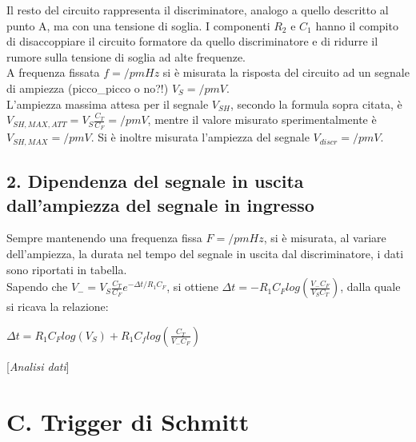 \documentclass[10pt,a4paper]{article}
\newcommand{\rem}[1]{[\emph{#1}]}
\begin{document}
Il resto del circuito rappresenta il discriminatore, analogo a quello descritto al punto A, ma con una tensione di soglia. I componenti $R_2$ e $C_1$ hanno il compito di disaccoppiare il circuito formatore da quello discriminatore e di ridurre il rumore sulla tensione di soglia ad alte frequenze.\\
A frequenza fissata $f = /pm Hz$ si è misurata la risposta del circuito ad un segnale di ampiezza (picco_picco o no?!) $V_S = /pm V$.\\
L'ampiezza massima attesa per il segnale $V_{SH}$, secondo la formula sopra citata, è $V_{SH,MAX,ATT} = V_S \frac{C_T}{C_F} =  /pm V$, mentre il valore misurato sperimentalmente è $V_{SH,MAX} = /pm V$.
Si è inoltre misurata l'ampiezza del segnale $V_{discr} = /pm V$.

\subsection*{2. Dipendenza del segnale in uscita dall'ampiezza del segnale in ingresso}

Sempre mantenendo una frequenza fissa $F = /pm Hz$, si è misurata, al variare dell'ampiezza, la durata nel tempo del segnale in uscita dal discriminatore, i dati sono riportati in tabella.\\

Sapendo che $V_-=V_S \frac{C_T}{C_F} e^{- \Delta t/R_1 C_F}$, si ottiene $\Delta t = -R_1 C_F log\left( \frac{V_- C_F}{V_S C_T}\right)$, dalla quale si ricava la relazione:
\begin{center}
$\Delta t = R_1 C_F log(V_S) + R_1 C_f log\left( \frac{C_T}{V_- C_F}\right)$
\end{center}

\rem{Analisi dati}

\section*{C. Trigger di Schmitt}
\end{document}
